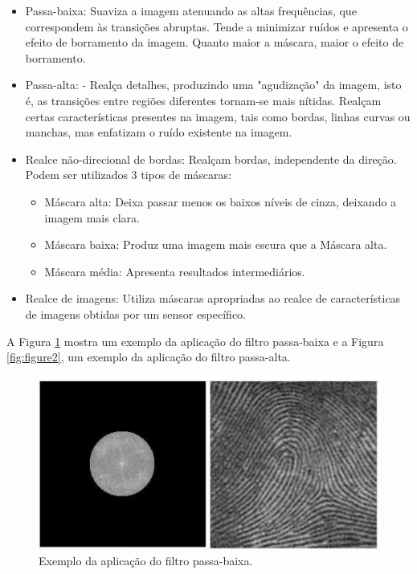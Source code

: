 \documentclass{article}
\begin{document}
\begin{itemize}
    \item Passa-baixa: Suaviza a imagem atenuando as altas frequências, que correspondem às transições abruptas. Tende a minimizar ruídos e apresenta o efeito de borramento da imagem. Quanto maior a máscara, maior o efeito de borramento.
    \item Passa-alta: - Realça detalhes, produzindo uma "agudização" da imagem, isto é, as transições entre regiões diferentes tornam-se mais nítidas. Realçam certas características presentes na imagem, tais como bordas, linhas curvas ou manchas, mas enfatizam o ruído existente na imagem. 
    \item Realce não-direcional de bordas: Realçam bordas, independente da direção. Podem ser utilizados 3 tipos de máscaras: 
    \begin{itemize}
        \item  Máscara alta: Deixa passar menos os baixos níveis de cinza, deixando a imagem mais clara.
        \item Máscara baixa: Produz uma imagem mais escura que a Máscara alta.
        \item Máscara média: Apresenta resultados intermediários.
    \end{itemize}
    \item Realce de imagens: Utiliza máscaras apropriadas ao realce de características de imagens obtidas por um sensor específico. 
\end{itemize}

A Figura \ref{fig:figure1} mostra um exemplo da aplicação do filtro passa-baixa e a Figura \ref{fig:figure2}, um exemplo da aplicação do filtro passa-alta.

\begin{figure}[!ht]
  \centering
  \includegraphics[scale=0.8]{Figure/figura1.PNG}
  \caption{Exemplo da aplicação do filtro passa-baixa.}
  \label{fig:figure1}
\end{figure}
\end{document}
